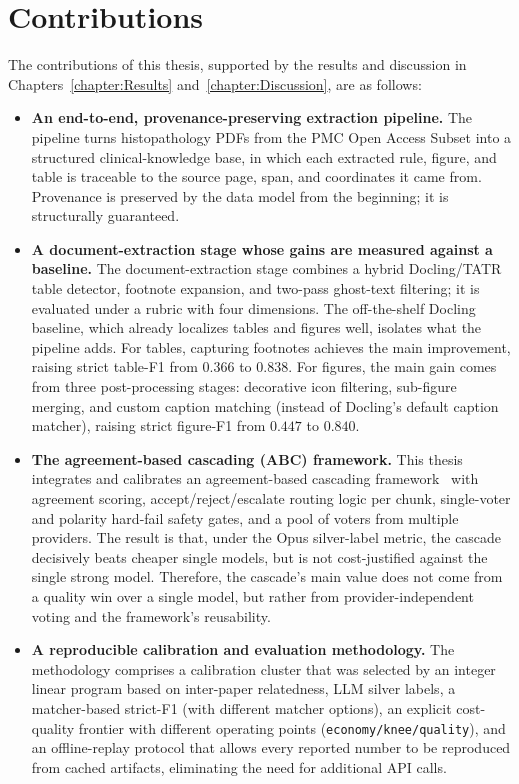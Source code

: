 \section{Contributions}\label{section:contributions}

The contributions of this thesis, supported by the results and discussion in Chapters~\ref{chapter:Results} and~\ref{chapter:Discussion}, are as follows: 

\begin{itemize}[label={},leftmargin=1.5em]
    \item \textbf{An end-to-end, provenance-preserving extraction pipeline.} The pipeline turns histopathology PDFs from the PMC Open Access Subset into a structured clinical-knowledge base, in which each extracted rule, figure, and table is traceable to the source page, span, and coordinates it came from. Provenance is preserved by the data model from the beginning; it is structurally guaranteed. 

    \item \textbf{A document-extraction stage whose gains are measured against a baseline.} The document-extraction stage combines a hybrid Docling/TATR table detector, footnote expansion, and two-pass ghost-text filtering; it is evaluated under a rubric with four dimensions. The off-the-shelf Docling baseline, which already localizes tables and figures well, isolates what the pipeline adds. For tables, capturing footnotes achieves the main improvement, raising strict table-F1 from $0.366$ to $0.838$. For figures, the main gain comes from three post-processing stages: decorative icon filtering, sub-figure merging, and custom caption matching (instead of Docling's default caption matcher), raising strict figure-F1 from $0.447$ to $0.840$.

    \item \textbf{The agreement-based cascading (ABC) framework.} This thesis integrates and calibrates an agreement-based cascading framework~\parencite{kolawole2025abc} with agreement scoring, accept/reject/escalate routing logic per chunk, single-voter and polarity hard-fail safety gates, and a pool of voters from multiple providers. The result is that, under the Opus silver-label metric, the cascade decisively beats cheaper single models, but is not cost-justified against the single strong model. Therefore, the cascade's main value does not come from a quality win over a single model, but rather from provider-independent voting and the framework's reusability.

    \item \textbf{A reproducible calibration and evaluation methodology.} The methodology comprises a calibration cluster that was selected by an integer linear program based on inter-paper relatedness, LLM silver labels, a matcher-based strict-F1 (with different matcher options), an explicit cost-quality frontier with different operating points (\texttt{economy/knee/quality}), and an offline-replay protocol that allows every reported number to be reproduced from cached artifacts, eliminating the need for additional API calls.


\end{itemize}
